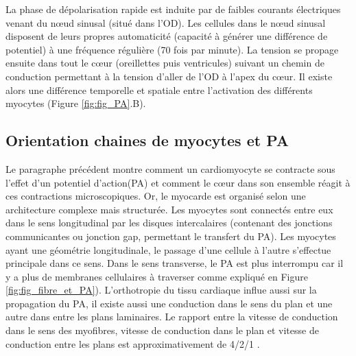 La phase de dépolarisation rapide est induite par de faibles courants électriques venant du nœud sinusal (situé dans l’OD). Les cellules dans le nœud sinusal disposent de leurs propres automaticité (capacité à générer une différence de potentiel) à une fréquence régulière (70 fois par minute). La tension se propage ensuite dans tout le cœur (oreillettes puis ventricules) suivant un chemin de conduction permettant à la tension d’aller de l’OD à l’apex du cœur. Il existe alors une différence temporelle et spatiale entre l’activation des différents myocytes (Figure \ref{fig:fig_PA}.B).\\


\subsection{Orientation chaines de myocytes et PA}

Le paragraphe précédent montre comment un cardiomyocyte se contracte sous l’effet d’un potentiel d'action(PA) et comment le cœur dans son ensemble réagit à ces contractions microscopiques. Or, le myocarde est organisé selon une architecture complexe mais structurée. Les myocytes sont connectés entre eux dans le sens longitudinal par les disques intercalaires (contenant des jonctions communicantes ou jonction gap, permettant le transfert du PA). Les myocytes ayant une géométrie longitudinale, le passage d’une cellule à l’autre s'effectue principale dans ce sens. Dans le sens transverse, le PA est plus interrompu car il y a plus de membranes cellulaires à traverser comme expliqué en Figure \ref{fig:fig_fibre_et_PA}). L’orthotropie du tissu cardiaque influe aussi sur la propagation du PA, il existe aussi une conduction dans le sens du plan et une autre dans entre les plans laminaires. Le rapport entre la vitesse de conduction dans le sens des myofibres, vitesse de conduction dans le plan et vitesse de conduction entre les plans est approximativement de 4/2/1 \cite{Caldwell2009} \cite{Hooks2007}. 

